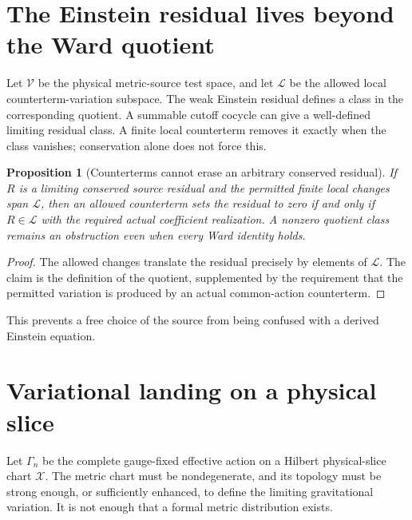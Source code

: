 \documentclass[11pt,a4paper,oneside]{book}
\theoremstyle{plain}
\newtheorem{proposition}[theorem]{Proposition}
\theoremstyle{definition}
\theoremstyle{remark}
\newcommand{\XX}{\mathcal X}
\begin{document}
\section{The Einstein residual lives beyond the Ward quotient}
Let $\mathscr V$ be the physical metric-source test space, and let $\mathscr L$ be the allowed local counterterm-variation subspace. The weak Einstein residual defines a class in the corresponding quotient. A summable cutoff cocycle can give a well-defined limiting residual class. A finite local counterterm removes it exactly when the class vanishes; conservation alone does not force this. \cite{R8,R13}

\begin{proposition}[Counterterms cannot erase an arbitrary conserved residual]
\label{prop:residual-class}
If $R$ is a limiting conserved source residual and the permitted finite local changes span $\mathscr L$, then an allowed counterterm sets the residual to zero if and only if $R\in\mathscr L$ with the required actual coefficient realization. A nonzero quotient class remains an obstruction even when every Ward identity holds.
\end{proposition}
\begin{proof}
The allowed changes translate the residual precisely by elements of $\mathscr L$. The claim is the definition of the quotient, supplemented by the requirement that the permitted variation is produced by an actual common-action counterterm.
\end{proof}
This prevents a free choice of the source from being confused with a derived Einstein equation.

\section{Variational landing on a physical slice}
Let $\Gamma_n$ be the complete gauge-fixed effective action on a Hilbert physical-slice chart $\XX$. The metric chart must be nondegenerate, and its topology must be strong enough, or sufficiently enhanced, to define the limiting gravitational variation. It is not enough that a formal metric distribution exists.
\end{document}
